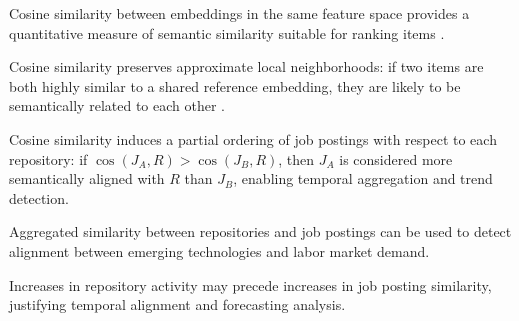 \begin{argument}
{  %
  \item Cosine similarity between embeddings in the same feature space provides a quantitative measure of semantic similarity suitable for ranking items \cite{mikolov2013distributed, reimers_2019_SentenceBERTSentence}.
  \item Cosine similarity preserves approximate local neighborhoods: if two items are both highly similar to a shared reference embedding, they are likely to be semantically related to each other \cite{ethayarajh2019contextual}.
  \item Cosine similarity induces a partial ordering of job postings with respect to each repository: if $\cos(J_A, R) > \cos(J_B, R)$, then $J_A$ is considered more semantically aligned with $R$ than $J_B$, enabling temporal aggregation and trend detection.
  \item Aggregated similarity between repositories and job postings can be used to detect alignment between emerging technologies and labor market demand.
  \item Increases in repository activity may precede increases in job posting similarity, justifying temporal alignment and forecasting analysis.
}

\end{argument}
